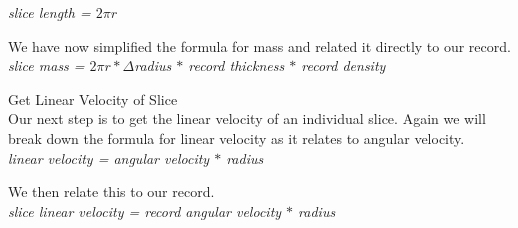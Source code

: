 \documentclass[a4paper, 11pt, oneside]{book} %
\begin{document}
\textit{slice length = $2\pi r$}

\vspace{0.5\baselineskip} %
\vspace{0.5\baselineskip} %
We have now simplified the formula for mass and related it directly to our record.\\
\vspace{0.5\baselineskip} %
\vspace{0.5\baselineskip} %
\textit{slice mass = $2\pi r * \Delta$radius $*$ record thickness $*$ record density}
\vspace{0.5\baselineskip} %
\vspace{0.5\baselineskip} %

{\LARGE Get Linear Velocity of Slice \\} %
\vspace{0.5\baselineskip} %
\vspace{0.5\baselineskip} %
Our next step is to get the linear velocity of an individual slice. Again we will break down the formula for linear velocity as it relates to angular velocity.\\

\vspace{0.5\baselineskip} %
\vspace{0.5\baselineskip} %
\textit{linear velocity = angular velocity $*$ radius}
\vspace{0.5\baselineskip} %
\vspace{0.5\baselineskip} %

We then relate this to our record.\\
\vspace{0.5\baselineskip} %
\vspace{0.5\baselineskip} %
\textit{slice linear velocity = record angular velocity $*$ radius}
\vspace{0.5\baselineskip} %
\vspace{0.5\baselineskip} %
\end{document}
